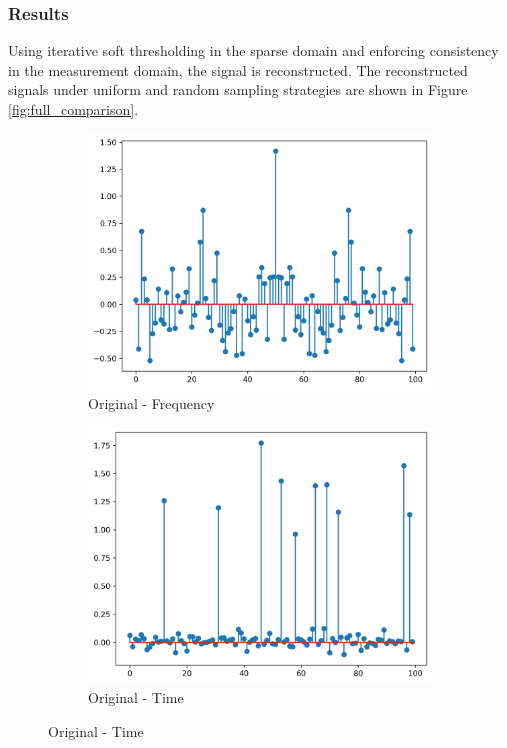 \documentclass[11pt]{article}
\begin{document}
\subsubsection{Results}
Using iterative soft thresholding in the sparse domain and enforcing consistency in the measurement domain, the signal is reconstructed. The reconstructed signals under uniform and random sampling strategies are shown in Figure \ref{fig:full_comparison}.

\begin{figure}[H]
    \centering
    \begin{subfigure}{.45\textwidth}
        \centering
        \includegraphics[width=\linewidth]{figs/q2b_original_sparse_signal_fft.png}
        \caption{Original - Frequency}
        \label{fig:original_signal_fft}
    \end{subfigure}%
    \begin{subfigure}{.45\textwidth}
        \centering
        \includegraphics[width=\linewidth]{figs/q2b_original_sparse_signal.png}
        \caption{Original - Time}
        \label{fig:original_signal}
    \end{subfigure}


\end{figure}
\end{document}
